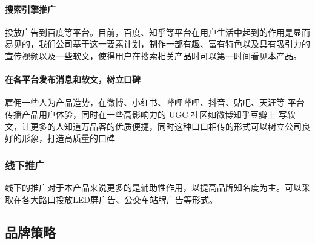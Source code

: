 \documentclass[master]{hduthesis}
\begin{document}
\paragraph{搜索引擎推广}


投放广告到百度等平台。目前，百度、知乎等平台在用户生活中起到的作用是显而易见的，我们公司基于这一要素计划，制作一部有趣、富有特色以及具有吸引力的宣传视频以及一些软文，使得用户在搜索相关产品时可以第一时间看见本产品。
\paragraph{在各平台发布消息和软文，树立口碑}


雇佣一些人为产品造势，在微博、小红书、哔哩哔哩、抖音、贴吧、天涯等 平台传播产品用户体验，同时在一些高影响力的 UGC 社区如微博知乎豆瓣上 写软文，让更多的人知道万品客的优质便捷，同时这种口口相传的形式可以树立公司良好的形象，打造高质量的口碑
\subsubsection{线下推广}
线下的推广对于本产品来说更多的是辅助性作用，以提高品牌知名度为主。可以采取在各大路口投放LED屏广告、公交车站牌广告等形式。
\subsection{品牌策略}
\end{document}
